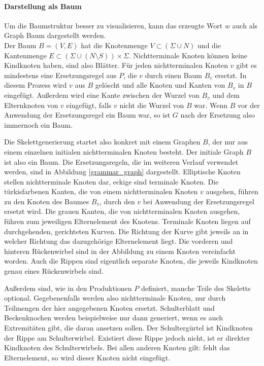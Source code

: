 \paragraph{Darstellung als Baum}
Um die Baumstruktur besser zu visualisieren, kann das erzeugte Wort $w$ auch als Graph \bzw Baum dargestellt werden.\\
Der Baum $B = (V, E)$ hat die Knotenmenge $V \subset (\Sigma \cup N)$ und die Kantenmenge $E \subset (\Sigma \cup (N \setminus S)) \times \Sigma$. Nichtterminale Knoten können keine Kindknoten haben, sind also Blätter. Für jeden nichtterminalen Knoten $v$ gibt es mindestens eine Ersetzungsregel aus $P$, die $v$ durch einen Baum $B_v$ ersetzt. In diesem Prozess wird $v$ aus $B$ gelöscht und alle Knoten und Kanten von $B_v$ in $B$ eingefügt. Außerdem wird eine Kante zwischen der Wurzel von $B_v$ und dem Elternknoten von $v$ eingefügt, falls $v$ nicht die Wurzel von $B$ war. Wenn $B$ vor der Anwendung der Ersetzungsregel ein Baum war, so ist $G$ nach der Ersetzung also immernoch ein Baum.

Die Skelettgenerierung startet also konkret mit einem Graphen $B$, der nur aus einem einzelnen initialen nichtterminalen Knoten besteht. Der initiale Graph $B$ ist also ein Baum.
Die Ersetzungsregeln, die im weiteren Verlauf verwendet werden, sind in Abbildung \ref{grammar_graph} dargestellt. 
Elliptische Knoten stellen nichtterminale Knoten dar, eckige sind terminale Knoten. Die türkisfarbenen Kanten, die von einem nichtterminalen Knoten $v$ ausgehen, führen zu den Knoten des Baumes $B_v$, durch den $v$ bei Anwendung der Ersetzungsregel ersetzt wird. Die grauen Kanten, die von nichtterminalen Knoten ausgehen, führen zum jeweiligen Elternelement des Knotens. Terminale Knoten liegen auf durchgehenden, gerichteten Kurven. Die Richtung der Kurve gibt jeweils an in welcher Richtung das dazugehörige Elternelement liegt.
Die vorderen und hinteren Rückenwirbel sind in der Abbildung zu einem Knoten vereinfacht worden. Auch die Rippen sind eigentlich separate Knoten, die jeweils Kindknoten genau eines Rückenwirbels sind.

Außerdem sind, wie in den Produktionen $P$ definiert, manche Teile des Skeletts optional. Gegebenenfalls werden also nichtterminale Knoten, nur durch Teilmengen der hier angegebenen Knoten ersetzt. Schulterblatt und Beckenknochen werden beispielweise nur dann generiert, wenn es auch Extremitäten gibt, die daran ansetzen sollen. Der Schultergürtel ist Kindknoten der Rippe am Schulterwirbel. Existiert diese Rippe jedoch nicht, ist er direkter Kindknoten des Schulterwirbels. Bei allen anderen Knoten gilt: fehlt das Elternelement, so wird dieser Knoten nicht eingefügt.

